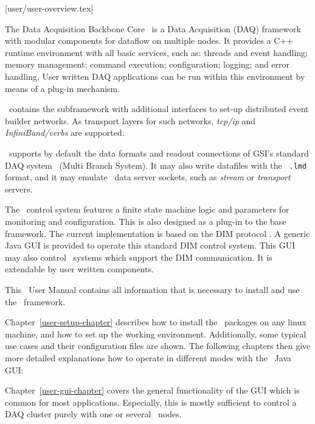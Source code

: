 [user/user-overview.tex]

The Data Acquisition Backbone Core \dabc\ is a
Data Acquisition (DAQ) framework with modular components for dataflow on multiple nodes.
It provides a C++ runtime environment with all basic services, such as:
threads and event handling; memory management; command execution; 
configuration; logging; and error handling.
User written DAQ applications can be run within this environment by
means of a plug-in mechanism.

\dabc\ contains the  subframework with additional interfaces 
to set-up distributed event builder networks. As transport layers for such
networks, {\em tcp/ip} and {\em InfiniBand/verbs} are supported.

\dabc\ supports by default the data formats and readout connections of GSI's standard DAQ system \mbs\ (Multi Branch System). It may also write datafiles with the 
\mbs\ {\tt *.lmd} format, and it may emulate \mbs\ data server sockets, such as
{\em stream} or {\em transport} servers.

The \dabc\ control system features a finite state machine
logic and parameters for monitoring and  configuration. This is also
designed as a plug-in to the base framework. The current implementation is based
on the DIM protocol \cite{DIM}.
A generic Java GUI is provided to operate this standard DIM control system.
This GUI may also control \mbs\ systems which support the DIM communication.
It is extendable by user written components. 




This \dabc\ User Manual contains all information that is necessary to
install and use the \dabc\ framework.

Chapter~\ref{user-setup-chapter} describes how to install the
\dabc\ packages on any linux machine, and how to set up the working
environment. Additionally, some typical use cases and their configuration
files are shown. 
The following chapters then give more detailed explanations how to operate
in different modes with the \dabc\ Java GUI:

Chapter~\ref{user-gui-chapter}
covers the general functionality of the GUI
which is common for most applications. Especially, this 
is mostly sufficient
to control a DAQ cluster purely with one or several \dabc\ nodes.

